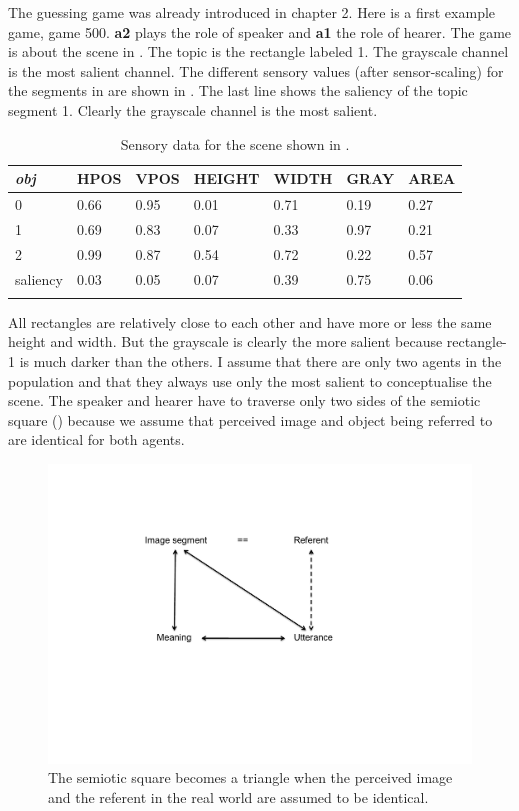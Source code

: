 The guessing game was already introduced in chapter 2. Here is a first example game, game 500.
{\bf a2} plays the role of speaker and {\bf a1} the role of hearer. The game is about the scene in
. The topic is the rectangle labeled 1. The grayscale channel is the most 
salient channel. The different sensory values (after sensor-scaling)
for the segments in  are shown in 
. The last line shows the saliency of 
the topic segment 1.  Clearly the grayscale channel is the most salient. 
\begin{table}
\begin{center}
\begin{tabular}{ l  l  l  l  l  l  l }
\lsptoprule
{\it obj} & HPOS & VPOS & HEIGHT & WIDTH & GRAY & AREA \\ \midrule
0 & 0.66 & 0.95 & 0.01 & 0.71 & 0.19 & 0.27\\ \midrule
1 & 0.69 & 0.83 & 0.07 & 0.33 & 0.97 & 0.21\\ \midrule
2 & 0.99 & 0.87 & 0.54 & 0.72 & 0.22 & 0.57\\ \midrule
saliency & 0.03 & 0.05 & 0.07 & 0.39 & 0.75 & 0.06 \\ \midrule
\lspbottomrule
\end{tabular}
\caption{\label{tab:t-rect1} Sensory data for the scene shown in .}
\end{center}
\end{table}
All rectangles are relatively close to each other and have more or less the 
same height and width. But the grayscale is clearly the more salient because rectangle-1 is 
much darker than the others. I assume that there are only two agents in the population and that they always use only 
the most salient to conceptualise the scene. 
The speaker and hearer have to traverse only 
two sides of the semiotic square ()
because we assume that perceived image and object being
referred to are identical for both agents. 
\begin{figure}[htbp]
  \centerline{\includegraphics[width=.50\textwidth]{chap6/figs/square6}}
\caption{\label{square6} The semiotic square becomes
a triangle when the perceived image and the referent in the
real world are assumed to be identical.} 
\end{figure}

